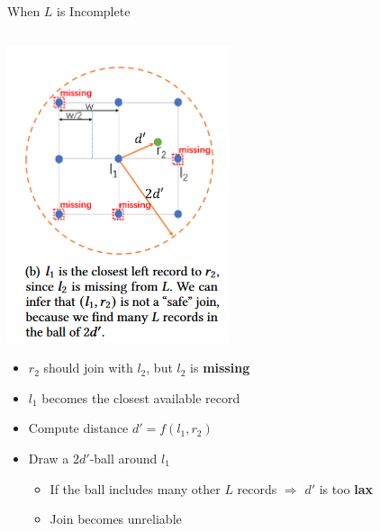 \documentclass[8pt]{beamer} %
\begin{document}
\begin{frame}{When \texorpdfstring{$L$}{L} is Incomplete}
\begin{columns}
			\small
			\begin{column}{0.43\textwidth}
				\centering
				\includegraphics[width=0.7\linewidth]{img/Pasted image 20250331211607.png}
			
				\begin{itemize}
					\item $r_2$ should join with $l_2$, but $l_2$ is \textbf{missing}
					\item $l_1$ becomes the closest available record
					\item Compute distance $d' = f(l_1, r_2)$
					\item Draw a 2$d'$-ball around $l_1$
					\begin{itemize}
						\item If the ball includes many other $L$ records $\Rightarrow$ $d'$ is too \textbf{lax}
						\item Join becomes unreliable
					\end{itemize}
				\end{itemize}
			\end{column}
			
		\end{columns}
		
	\end{frame}
	
\end{document}
